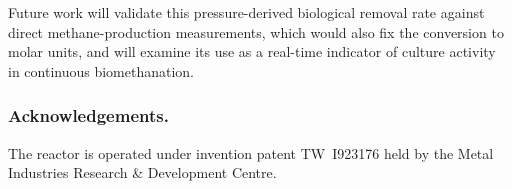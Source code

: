 \documentclass[runningheads]{llncs}
\begin{document}
Future work will validate this pressure-derived biological removal rate
against direct methane-production measurements, which would also fix
the conversion to molar units, and will examine its use as a real-time
indicator of culture activity in continuous biomethanation.

\subsubsection{Acknowledgements.} The reactor is operated under
invention patent TW~I923176 held by the Metal Industries Research \&
Development Centre.

\end{document}

